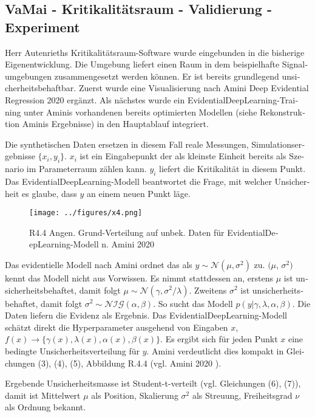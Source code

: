 \begin{otherlanguage}{ngerman}
\subsection*{VaMai - Kritikalitätsraum - Validierung - Experiment}

Herr Autenrieths Kritikalitätsraum-Software wurde eingebunden in die bisherige Eigenentwicklung. Die Umgebung liefert einen Raum in dem beispielhafte Signalumgebungen 
zusammengesetzt werden können. Er ist bereits grundlegend unsicherheitsbehaftbar. Zuerst wurde eine Visualisierung nach Amini Deep Evidential Regression 2020 ergänzt. Als nächstes wurde ein \gls{EvidentialDeepLearning}-Training unter Aminis vorhandenen bereits optimierten Modellen (siehe Rekonstruktion Aminis Ergebnisse) in den Hauptablauf integriert. 

Die synthetischen Daten ersetzen in diesem Fall reale Messungen, Simulationsergebnisse $\{ x_{i}, y_{i} \}$. $x_{i}$ ist ein Eingabepunkt der als kleinste Einheit bereits als Szenario im Parameterraum zählen kann. $y_{i}$ liefert die Kritikalität in diesem Punkt. Das \gls{EvidentialDeepLearning}-Modell beantwortet die Frage, mit welcher Unsicherheit es glaube, dass $y$ an einem neuen Punkt läge. 

\begin{figure}[!ht]
  \centering
  \texttt{[image: ../figures/x4.png]}
  \caption{R4.4 Angen. Grund-Verteilung auf unbek. Daten für \gls{EvidentialDeepLearning}-Modell n. Amini 2020}
\end{figure}

Das evidentielle Modell nach Amini ordnet das als $y \sim \mathcal{N}(\mu, \sigma^2)$ zu. $(\mu$, $\sigma^2)$ kennt das Modell nicht aus Vorwissen. Es nimmt stattdessen an, erstens $\mu$ ist unsicherheitsbehaftet, damit folgt $\mu \sim \mathcal{N}(\gamma, \sigma^{2} / \lambda)$. Zweitens $\sigma^{2}$ ist unsicherheitsbehaftet, damit folgt $\sigma^{2} \sim \mathcal{NIG}(\alpha, \beta)$. So sucht das Modell $p(y|\gamma,\lambda,\alpha,\beta)$. Die Daten liefern die Evidenz als Ergebnis. Das \gls{EvidentialDeepLearning}-Modell schätzt direkt die Hyperparameter ausgehend von Eingaben $x$, $f(x) \rightarrow \{ \gamma(x), \lambda(x), \alpha(x), \beta(x) \}$. Es ergibt sich für jeden Punkt $x$ eine bedingte Unsicherheitsverteilung für $y$. Amini verdeutlicht dies kompakt in Gleichungen (3), (4), (5), Abbildung R.4.4 (vgl. Amini 2020 \parencite{amini2020}). 

Ergebende Unsicherheitsmasse ist Student-t-verteilt (vgl. Gleichungen (6), (7)), damit ist Mittelwert $\mu$ als \glqq{}Position\grqq{}, Skalierung $\sigma^{2}$ als \glqq{}Streuung\grqq{}, Freiheitsgrad $\nu$ als \glqq{}Ordnung\grqq{} bekannt. 


\end{otherlanguage}
